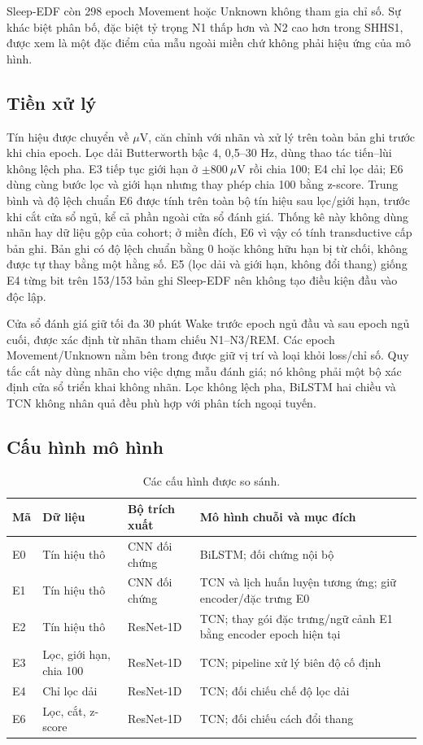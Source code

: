 \documentclass[10pt,a4paper]{article}
\begin{document}
Sleep-EDF còn 298 epoch Movement hoặc Unknown không tham gia chỉ số. Sự khác biệt phân bố, đặc biệt tỷ trọng N1 thấp hơn và N2 cao hơn trong SHHS1, được xem là một đặc điểm của mẫu ngoài miền chứ không phải hiệu ứng của mô hình.

\subsection{Tiền xử lý}

Tín hiệu được chuyển về $\mu\mathrm{V}$, căn chỉnh với nhãn và xử lý trên toàn bản ghi trước khi chia epoch. Lọc dải Butterworth bậc 4, 0,5--30 Hz, dùng thao tác tiến--lùi không lệch pha. E3 tiếp tục giới hạn ở $\pm800~\mu\mathrm{V}$ rồi chia 100; E4 chỉ lọc dải; E6 dùng cùng bước lọc và giới hạn nhưng thay phép chia 100 bằng z-score. Trung bình và độ lệch chuẩn E6 được tính trên toàn bộ tín hiệu sau lọc/giới hạn, trước khi cắt cửa sổ ngủ, kể cả phần ngoài cửa sổ đánh giá. Thống kê này không dùng nhãn hay dữ liệu gộp của cohort; ở miền đích, E6 vì vậy có tính transductive cấp bản ghi. Bản ghi có độ lệch chuẩn bằng 0 hoặc không hữu hạn bị từ chối, không được tự thay bằng một hằng số. E5 (lọc dải và giới hạn, không đổi thang) giống E4 từng bit trên 153/153 bản ghi Sleep-EDF nên không tạo điều kiện đầu vào độc lập.

Cửa sổ đánh giá giữ tối đa 30 phút Wake trước epoch ngủ đầu và sau epoch ngủ cuối, được xác định từ nhãn tham chiếu N1--N3/REM. Các epoch Movement/Unknown nằm bên trong được giữ vị trí và loại khỏi loss/chỉ số. Quy tắc cắt này dùng nhãn cho việc dựng mẫu đánh giá; nó không phải một bộ xác định cửa sổ triển khai không nhãn. Lọc không lệch pha, BiLSTM hai chiều và TCN không nhân quả đều phù hợp với phân tích ngoại tuyến.

\subsection{Cấu hình mô hình}

\begin{table}[t]
\centering
\caption{Các cấu hình được so sánh.}
\label{tab:configs}
\small
\begin{tabularx}{\textwidth}{lYYY}
\toprule
\textbf{Mã} & \textbf{Dữ liệu} & \textbf{Bộ trích xuất} & \textbf{Mô hình chuỗi và mục đích} \\
\midrule
E0 & Tín hiệu thô & CNN đối chứng & BiLSTM; đối chứng nội bộ \\
E1 & Tín hiệu thô & CNN đối chứng & TCN và lịch huấn luyện tương ứng; giữ encoder/đặc trưng E0 \\
E2 & Tín hiệu thô & ResNet-1D & TCN; thay gói đặc trưng/ngữ cảnh E1 bằng encoder epoch hiện tại \\
E3 & Lọc, giới hạn, chia 100 & ResNet-1D & TCN; pipeline xử lý biên độ cố định \\
E4 & Chỉ lọc dải & ResNet-1D & TCN; đối chiếu chế độ lọc dải \\
E6 & Lọc, cắt, z-score & ResNet-1D & TCN; đối chiếu cách đổi thang \\
\bottomrule
\end{tabularx}
\end{table}
\end{document}
